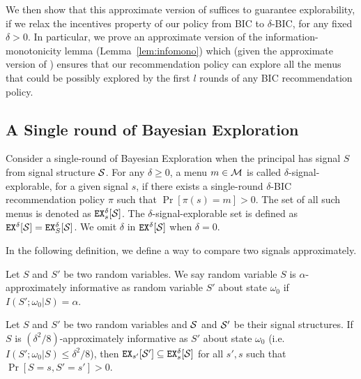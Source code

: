We then show that this approximate version of   suffices to guarantee explorability, if we relax the incentives property of our policy from BIC to $\delta$-BIC, for any fixed $\delta>0$. In particular, we prove an approximate version of the information-monotonicity lemma (Lemma~\ref{lem:infomono}) which (given the approximate version of ) ensures that our recommendation policy can explore all the menus that could be possibly explored by the first $l$ rounds of any BIC recommendation policy.


\subsection{A Single round of Bayesian Exploration}
\label{sec:private_single}


\begin{definition}
Consider a single-round of Bayesian Exploration when the principal has signal $S$ from signal structure $\S$. For any $\delta \geq 0$, a menu $m \in \M$ is called $\delta$-signal-explorable, for a given signal $s$, if there exists a single-round $\delta$-BIC recommendation policy $\pi$ such that $\Pr[\pi(s) = m] > 0$. The set of all such menus is denoted as $\EX^{\delta}_s[\S]$. The $\delta$-signal-explorable set is defined as $\EX^{\delta}[\S] = \EX^{\delta}_S[\S]$. We omit $\delta$ in $\EX^{\delta}[\S]$ when $\delta = 0$.
\end{definition}

In the following definition, we define a way to compare two signals approximately.
\begin{definition}
Let $S$ and $S'$ be two random variables. We say random variable $S$ is $\alpha$-approximately informative as random variable $S'$ about state $\omega_0$ if $I(S' ; \omega_0|S) = \alpha$.
\end{definition}

\begin{lemma}
\label{lem:ainfomono}
Let $S$ and $S'$ be two random variables and $\S$ and $\S'$ be their signal structures. If $S$ is $(\delta^2/8)$-approximately informative as $S'$ about state $\omega_0$ (i.e. $I(S' ; \omega_0|S) \leq \delta^2/8$), then $\EX_{s'}[\S'] \subseteq \EX^{\delta}_s[\S]$  for all $s' ,s$ such that $\Pr[S= s, S'= s'] > 0$.
\end{lemma}

